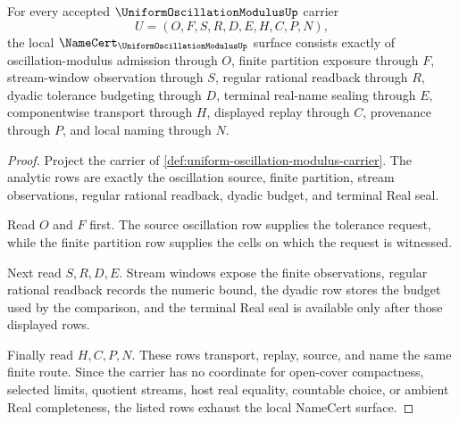 \begin{theorem}
\label{thm:uniform-oscillation-modulus-namecert-obligations}
For every accepted $\UniformOscillationModulusUp$ carrier
$$
U=(O,F,S,R,D,E,H,C,P,N),
$$
the local $\NameCert_{\UniformOscillationModulusUp}$ surface consists exactly of oscillation-modulus admission through $O$, finite partition exposure through $F$, stream-window observation through $S$, regular rational readback through $R$, dyadic tolerance budgeting through $D$, terminal real-name sealing through $E$, componentwise transport through $H$, displayed replay through $C$, provenance through $P$, and local naming through $N$.
\end{theorem}
\begin{proof}
Project the carrier of \autoref{def:uniform-oscillation-modulus-carrier}. The analytic rows are exactly the oscillation source, finite partition, stream observations, regular rational readback, dyadic budget, and terminal Real seal.

Read $O$ and $F$ first. The source oscillation row supplies the tolerance request, while the finite partition row supplies the cells on which the request is witnessed.

Next read $S,R,D,E$. Stream windows expose the finite observations, regular rational readback records the numeric bound, the dyadic row stores the budget used by the comparison, and the terminal Real seal is available only after those displayed rows.

Finally read $H,C,P,N$. These rows transport, replay, source, and name the same finite route. Since the carrier has no coordinate for open-cover compactness, selected limits, quotient streams, host real equality, countable choice, or ambient Real completeness, the listed rows exhaust the local NameCert surface.
\end{proof}

